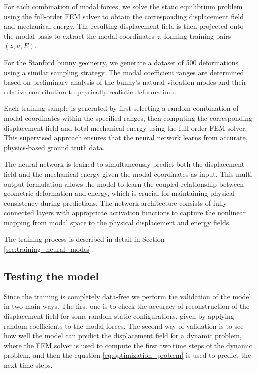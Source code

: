 For each combination of modal forces, we solve the static equilibrium problem using the full-order FEM solver to obtain the corresponding displacement field and mechanical energy. The resulting displacement field is then projected onto the modal basis to extract the modal coordinates $z$, forming training pairs $(z, u, E)$.

For the Stanford bunny geometry, we generate a dataset of 500 deformations using a similar sampling strategy. The modal coefficient ranges are determined based on preliminary analysis of the bunny's natural vibration modes and their relative contribution to physically realistic deformations.

Each training sample is generated by first selecting a random combination of modal coordinates within the specified ranges, then computing the corresponding displacement field and total mechanical energy using the full-order FEM solver. This supervised approach ensures that the neural network learns from accurate, physics-based ground truth data.

The neural network is trained to simultaneously predict both the displacement field and the mechanical energy given the modal coordinates as input. This multi-output formulation allows the model to learn the coupled relationship between geometric deformation and energy, which is crucial for maintaining physical consistency during predictions. The network architecture consists of fully connected layers with appropriate activation functions to capture the nonlinear mapping from modal space to the physical displacement and energy fields.

The training process is described in detail in Section \ref{sec:training_neural_modes}.

\subsection{Testing the model}
\label{sec:testing_model}
Since the training is completely data-free we perform the validation of the model in two main ways. The first one is to check the accuracy of reconstruction of the displacement field for some random static configurations, given by applying random coefficients to the modal forces. The second way of validation is to see how well the model can predict the displacement field for a dynamic problem, where the FEM solver is used to compute the first two time steps of the dynamic problem, and then the equation \ref{eq:optimization_problem} is used to predict the next time steps. 

